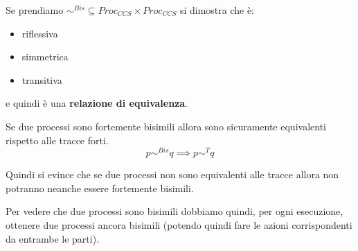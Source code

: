 \begin{definizione}
  Se prendiamo $\sim^{Bis}\subseteq Proc_{CCS}\times Proc_{CCS}$ si dimostra che è:
  \begin{itemize}
    \item riflessiva
    \item simmetrica
    \item transitiva
  \end{itemize}
  e quindi è una \textbf{relazione di equivalenza}.\\
\end{definizione} \vspace{5mm} %
\begin{definizione}
  Se due processi sono fortemente bisimili allora sono sicuramente equivalenti
  rispetto alle tracce forti. 
  \[p\sim^{Bis}q \implies p\sim^{T}q\]
  \pagestyle{empty}
\begin{center}
\end{center}
  \begin{nota}
  Quindi si evince che se due processi non sono equivalenti alle tracce allora non potranno neanche essere fortemente bisimili.
\end{nota}
\end{definizione} \vspace{5mm} %
Per vedere che due processi sono bisimili dobbiamo quindi, per ogni esecuzione,
ottenere due processi ancora bisimili (potendo quindi fare le azioni
corrispondenti da entrambe le parti). 
